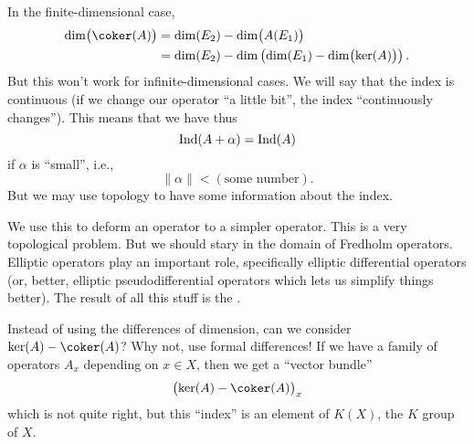 In the finite-dimensional case,
\begin{equation}
\begin{split}
\dim\bigl(\coker(A)\bigr)
&=\dim(E_{2})-\dim\bigl(A(E_{1})\bigr)\\
&=\dim(E_{2})-\dim\left(\dim(E_{1})-\dim\bigl(\ker(A)\bigr)\right).
\end{split}
\end{equation}
But this won't work for infinite-dimensional cases. We will say
that the index is continuous (if we change our operator ``a
little bit'', the index ``continuously changes''). This means
that we have thus
\begin{equation}
\mathop{\mathrm{Ind}}\nolimits(A+\alpha)=\mathop{\mathrm{Ind}}\nolimits(A)
\end{equation}
if $\alpha$ is ``small'', i.e., 
\begin{equation}
\|\alpha\|<(\mbox{some number}).
\end{equation}
But we may use topology to have some information about the index.

We use this to deform an operator to a simpler operator. This is
a very topological problem. But we should stary in the domain of
Fredholm operators. Elliptic operators play an important role,
specifically elliptic differential operators (or, better,
elliptic pseudodifferential operators which lets us simplify
things better). The result of all this stuff is the
.

Instead of using the differences of dimension, can we consider
$\ker(A)-\coker(A)$? Why not, use formal differences! If we have
a family of operators $A_{x}$ depending on $x\in X$, then we get
a ``vector bundle''
\begin{equation}
\bigl(\ker(A)-\coker(A)\bigr)_{x}
\end{equation}
which is not quite right, but this ``index'' is an element of
$K(X)$, the $K$ group of $X$.
